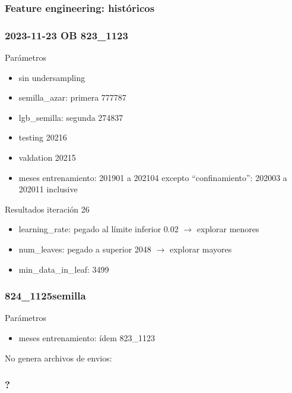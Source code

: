 \documentclass[aspectratio=43]{beamer}
\begin{document}
\begin{frame}
	\frametitle{Feature engineering: históricos}
	

\end{frame}


\begin{frame}
	\frametitle{2023-11-23 OB 823\_1123}
	Parámetros
	\begin{itemize}
		\item sin undersampling
		\item semilla\_azar: primera 777787
		\item lgb\_semilla: segunda 274837
		\item testing 20216
		\item valdation 20215
		\item meses entrenamiento: 201901 a 202104 excepto ``confinamiento'': 202003 a 202011 inclusive
	\end{itemize}
	Resultados iteración 26
	\begin{itemize}
		\item learning\_rate: pegado al límite inferior 0.02  \(\rightarrow\) explorar menores
		\item num\_leaves: pegado a superior 2048 \(\rightarrow\) explorar mayores
		\item min\_data\_in\_leaf: 3499 
	\end{itemize}
\end{frame}


\begin{frame}
	\frametitle{824\_1125semilla}
	Parámetros
	\begin{itemize}
		\item meses entrenamiento: ídem 823\_1123
	\end{itemize}
	No genera archivos de envios:
\end{frame}


\begin{frame}
	\frametitle{?}
\end{frame}
\end{document}
